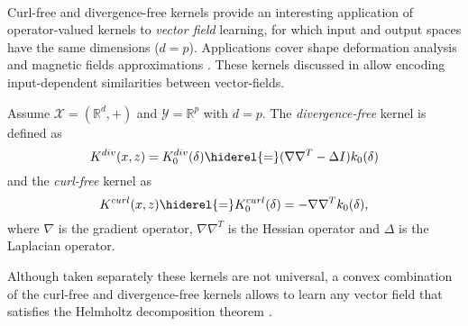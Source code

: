 \paragraph{}
Curl-free and divergence-free kernels provide an interesting application of operator-valued kernels \citep{Macedo2008, Baldassare2012, Micheli2013} to \emph{vector field} learning, for which input and output spaces have the same dimensions ($d=p$). %
Applications cover shape deformation analysis \citep{Micheli2013} and magnetic fields approximations \citep{Wahlstrom2013}. %
These kernels discussed in \citep{Fuselier2006} allow encoding input-dependent similarities between vector-fields. %
\begin{definition}\label{curl-div-free}
Assume $\mathcal{X}=(\mathbb{R}^d, +)$ and $\mathcal{Y}=\mathbb{R}^p$ with $d=p$. %
The \emph{divergence-free} kernel is defined as %
\begin{dmath*}\label{div-def}
K^{div}(x,z)=K^{div}_0(\delta)
\hiderel{=} (\nabla\nabla^T - \Delta I) k_0(\delta)
\end{dmath*} %
and the \emph{curl-free} kernel as %
\begin{dmath*}\label{curl-def}
K^{curl}(x,z)\hiderel{=}K_0^{curl}(\delta)=-\nabla\nabla^T k_0(\delta),
\end{dmath*} %
where $\nabla$ is the gradient operator, $\nabla\nabla^T$ is the Hessian operator and $\Delta$ is the Laplacian operator. %
\end{definition}
Although taken separately these kernels are not universal, a convex combination of the curl-free and divergence-free kernels allows to learn any vector field that satisfies the Helmholtz decomposition theorem \citep{Macedo2008, Baldassare2012}.

\chapterend
